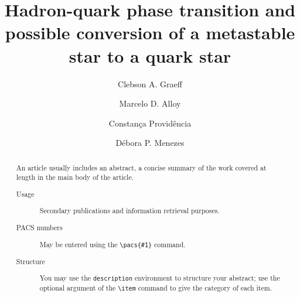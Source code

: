 \documentclass[prc, reprint, amsmath, floatfix,10pt]{revtex4-1}
\begin{document}

%
%

\title{Hadron-quark phase transition and possible conversion of a metastable star to a quark star}

\author{Clebson A. Graeff}

\author{Marcelo D. Alloy}

\author{Constança Providência}

\author{Débora P. Menezes}


\begin{abstract}
An article usually includes an abstract, a concise summary of the work
covered at length in the main body of the article. 
\begin{description}
\item[Usage]
Secondary publications and information retrieval purposes.
\item[PACS numbers]
May be entered using the \verb+\pacs{#1}+ command.
\item[Structure]
You may use the \texttt{description} environment to structure your abstract;
use the optional argument of the \verb+\item+ command to give the category of each item. 
\end{description}
\end{abstract}




\maketitle

%
%

\end{document}
